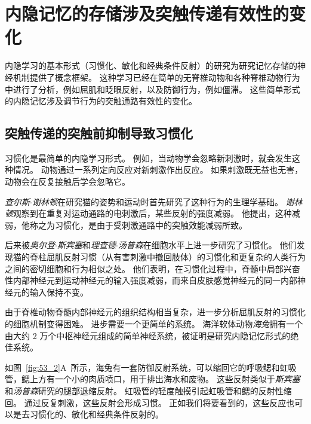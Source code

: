 \section{内隐记忆的存储涉及突触传递有效性的变化}

内隐学习的基本形式（习惯化、敏化和经典条件反射）的研究为研究记忆存储的神经机制提供了概念框架。
这种学习已经在简单的无脊椎动物和各种脊椎动物行为中进行了分析，例如屈肌和眨眼反射，以及防御行为，例如僵滞。
这些简单形式的内隐记忆涉及调节行为的突触通路有效性的变化。



\subsection{突触传递的突触前抑制导致习惯化}

习惯化是最简单的内隐学习形式。
例如，当动物学会忽略新刺激时，就会发生这种情况。
动物通过一系列定向反应对新刺激作出反应。
如果刺激既无益也无害，动物会在反复接触后学会忽略它。


\textit{查尔斯$\cdot$谢林顿}在研究猫的姿势和运动时首先研究了这种行为的生理学基础。
\textit{谢林顿}观察到在重复对运动通路的电刺激后，某些反射的强度减弱。
他提出，这种减弱，他称之为习惯化，是由于受刺激通路中的突触效能减弱所致。


后来被\textit{奥尔登$\cdot$斯宾塞}和\textit{理查德$\cdot$汤普森}在细胞水平上进一步研究了习惯化。
他们发现猫的脊柱屈肌反射习惯（从有害刺激中撤回肢体）的习惯化和更复杂的人类行为之间的密切细胞和行为相似之处。
他们表明，在习惯化过程中，脊髓中局部兴奋性内部神经元到运动神经元的输入强度减弱，而来自皮肤感觉神经元的同一内部神经元的输入保持不变。


由于脊椎动物脊髓内部神经元的组织结构相当复杂，进一步分析屈肌反射的习惯化的细胞机制变得困难。
进步需要一个更简单的系统。
海洋软体动物\textit{海兔}拥有一个由大约 2 万个中枢神经元组成的简单神经系统，被证明是研究内隐记忆形式的绝佳系统。


如图~\ref{fig:53_2}A~所示，海兔有一套防御反射系统，可以缩回它的呼吸鳃和虹吸管，鳃上方有一个小的肉质喷口，用于排出海水和废物。
这些反射类似于\textit{斯宾塞}和\textit{汤普森}研究的腿部退缩反射。
虹吸管的轻度触摸引起虹吸管和鳃的反射性缩回。
通过反复刺激，这些反射会形成习惯。
正如我们将要看到的，这些反应也可以是去习惯化的、敏化和经典条件反射的。


